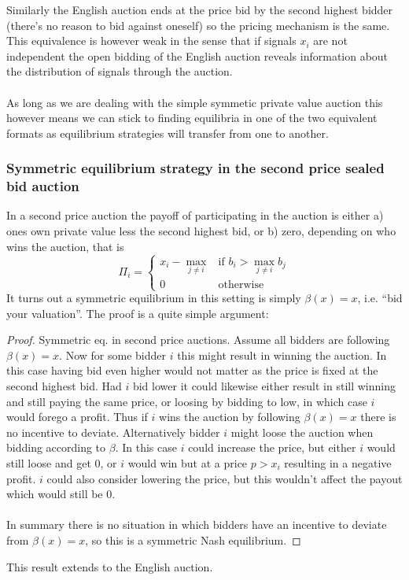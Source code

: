Similarly the English auction ends at the price bid by the second highest bidder (there's no reason to bid against oneself) so the pricing mechanism is the same. This equivalence is however weak in the sense that if signals $x_i$ are not independent the open bidding of the English auction reveals information about the distribution of signals through the auction.
\\ \\
As long as we are dealing with the simple symmetic private value auction this however means we can stick to finding equilibria in one of the two equivalent formats as equilibrium strategies will transfer from one to another.

\subsubsection{Symmetric equilibrium strategy in the second price sealed bid auction}
In a second price auction the payoff of participating in the auction is either a) ones own private value less the second highest bid, or b) zero, depending on who wins the auction, that is
\begin{equation}
  \Pi_i =
  \begin{cases}
  x_i - {\max}_{j\neq i} & \textrm{if } b_i > \max_{j\neq i} b_j \\
 0 & \textrm{otherwise}
\end{cases}
\end{equation}
It turns out a symmetric equilibrium in this setting is simply $\beta(x) = x$, i.e. ``bid your valuation''. The proof is a quite simple argument:
\begin{proof}{Symmetric eq. in second price auctions.}
Assume all bidders are following $\beta(x)=x$. Now for some bidder $i$ this might result in winning the auction. In this case having bid even higher would not matter as the price is fixed at the second highest bid. Had $i$ bid lower it could likewise either result in still winning and still paying the same price, or loosing by bidding to low, in which case $i$ would forego a profit. Thus if $i$ wins the auction by following $\beta(x)=x$ there is no incentive to deviate. Alternatively bidder $i$ might loose the auction when bidding according to $\beta$. In this case $i$ could increase the price, but either $i$ would still loose and get 0, or $i$ would win but at a price $p>x_i$ resulting in a negative profit. $i$ could also consider lowering the price, but this wouldn't affect the payout which would still be 0.
\\ \\
In summary there is no situation in which bidders have an incentive to deviate from $\beta(x)=x$, so this is a symmetric Nash equilibrium.
\end{proof}
This result extends to the English auction.

